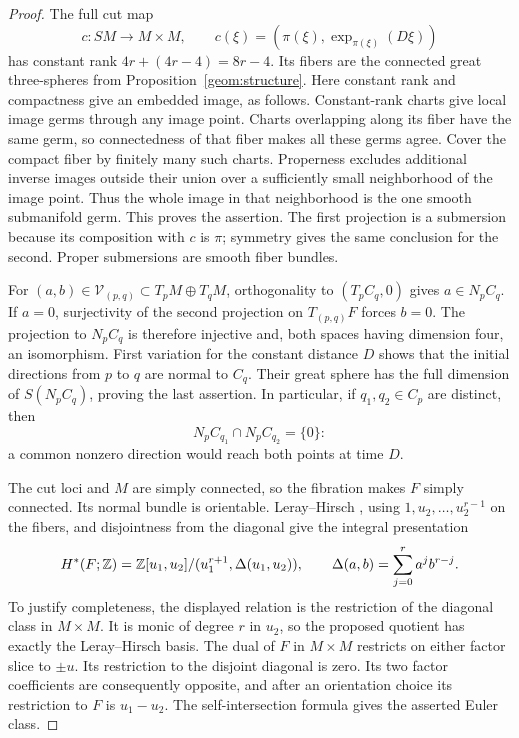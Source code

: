 \begin{proof}
The full cut map
\[
 c:SM\longrightarrow M\times M,\qquad
 c(\xi)=(\pi(\xi),\exp_{\pi(\xi)}(D\xi))
\]
has constant rank $4r+(4r-4)=8r-4$. Its fibers are the connected
great three-spheres from Proposition~\ref{geom:structure}.
Here constant rank and compactness give an embedded image,
as follows. Constant-rank charts give local image germs through
any image point. Charts overlapping along its fiber have the
same germ, so connectedness of that fiber makes all these germs
agree. Cover the compact fiber by finitely many such charts.
Properness excludes additional inverse images outside their
union over a sufficiently small neighborhood of the image point.
Thus the whole image in that neighborhood is the one smooth
submanifold germ. This proves the assertion. The first projection
is a submersion because its composition with $c$ is $\pi$;
symmetry gives the same conclusion for the second. Proper
submersions are smooth fiber bundles.

For $(a,b)\in \mathcal V_{(p,q)}\subset T_pM\oplus T_qM$, orthogonality
to $(T_pC_q,0)$ gives $a\in N_pC_q$. If $a=0$, surjectivity
of the second projection on $T_{(p,q)}F$ forces $b=0$.
The projection to $N_pC_q$ is therefore injective and, both
spaces having dimension four, an isomorphism. First variation
for the constant distance $D$ shows that the initial directions
from $p$ to $q$ are normal to $C_q$. Their great sphere has
the full dimension of $S(N_pC_q)$, proving the last assertion.
In particular, if $q_1,q_2\in C_p$ are distinct, then
\begin{equation}\label{inc:disjoint-planes}
 N_pC_{q_1}\cap N_pC_{q_2}=\{0\}:
\end{equation}
a common nonzero direction would reach both points at time $D$.

The cut loci and $M$ are simply connected, so the fibration
makes $F$ simply connected. Its normal bundle is orientable.
Leray--Hirsch \citep[Theorem~4D.1]{Hatcher2002}, using
$1,u_2,\ldots,u_2^{r-1}$ on the fibers,
and disjointness from the diagonal give the integral presentation
\begin{equation}\label{inc:ring}
 H^*(F;\mathbb Z)=\mathbb Z[u_1,u_2]/(u_1^{r+1},\Delta(u_1,u_2)),
 \qquad \Delta(a,b)=\sum_{j=0}^r a^jb^{r-j}.
\end{equation}
To justify completeness, the displayed relation is the restriction
of the diagonal class in $M\times M$. It is monic of degree $r$
in $u_2$, so the proposed quotient has exactly the Leray--Hirsch
basis. The dual of $F$ in $M\times M$ restricts on either factor
slice to $\pm u$. Its restriction to the disjoint diagonal is
zero. Its two factor coefficients are consequently opposite,
and after an orientation choice its restriction to $F$ is $u_1-u_2$.
The self-intersection formula gives the asserted Euler class.


\end{proof}
